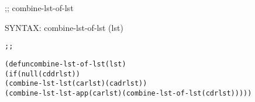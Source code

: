 \begin{aibox}{\function}
;; combine-lst-of-lst

SYNTAX: combine-lst-of-lst (lst)
\end{aibox}

\begin{aibox}{\examples}
\begin{alltt}
\end{alltt}

\end{aibox}

\begin{aibox}{\comments}

\end{aibox}
\begin{aibox}{\answers}

\end{aibox}
\begin{aibox}{\othercomments}

\end{aibox}
\begin{aibox}{\pseudocode}

\end{aibox}
\begin{aibox}{\code}

\begin{alltt}
;;%% code

(defun combine-lst-of-lst (lst)
    (if (null (cddr lst))
            (combine-lst-lst (car lst) (cadr lst))
    (combine-lst-lst-app (car lst) (combine-lst-of-lst (cdr lst)))))
\end{alltt}
\end{aibox}
